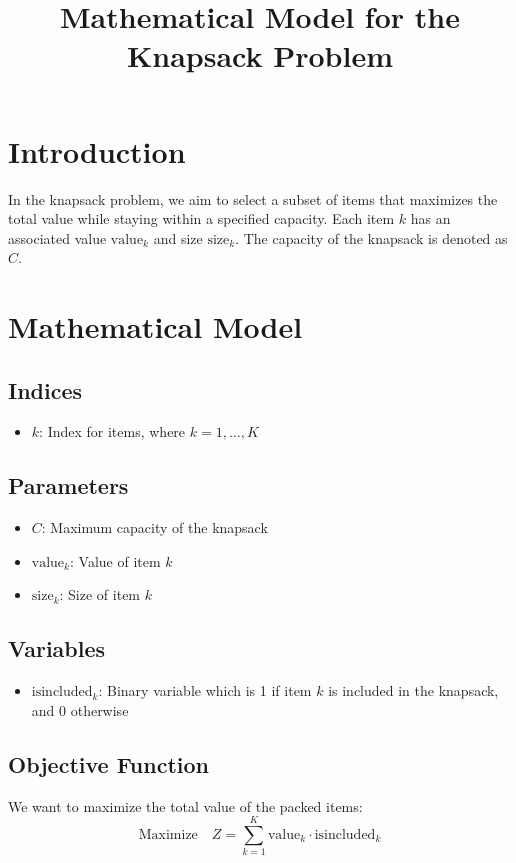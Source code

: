 \documentclass{article}
\begin{document}
\title{Mathematical Model for the Knapsack Problem}
\author{}
\date{}
\maketitle

\section{Introduction}
In the knapsack problem, we aim to select a subset of items that maximizes the total value while staying within a specified capacity. Each item \( k \) has an associated value \( \text{value}_{k} \) and size \( \text{size}_{k} \). The capacity of the knapsack is denoted as \( C \).

\section{Mathematical Model}

\subsection{Indices}
\begin{itemize}
    \item \( k \): Index for items, where \( k = 1, \ldots, K \)
\end{itemize}

\subsection{Parameters}
\begin{itemize}
    \item \( C \): Maximum capacity of the knapsack
    \item \( \text{value}_{k} \): Value of item \( k \)
    \item \( \text{size}_{k} \): Size of item \( k \)
\end{itemize}

\subsection{Variables}
\begin{itemize}
    \item \( \text{isincluded}_{k} \): Binary variable which is 1 if item \( k \) is included in the knapsack, and 0 otherwise
\end{itemize}

\subsection{Objective Function}
We want to maximize the total value of the packed items:
\[
\text{Maximize} \quad Z = \sum_{k=1}^{K} \text{value}_{k} \cdot \text{isincluded}_{k}
\]
\end{document}
